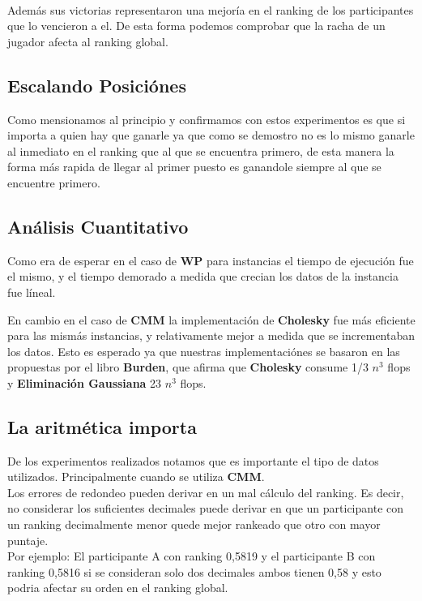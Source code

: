 \\
Además sus victorias representaron una mejoría en el ranking de los participantes que lo vencieron a el. De esta forma podemos comprobar que la racha de un jugador afecta al ranking global.\\


\subsection{Escalando Posici\'ones}
Como mensionamos al principio y confirmamos con estos experimentos es que si importa a quien hay que ganarle ya que como se demostro no es lo mismo ganarle al inmediato en el 
ranking que al que se encuentra primero,
de esta manera la forma m\'as rapida de llegar al primer puesto es ganandole siempre al que se encuentre primero.

\subsection{Análisis Cuantitativo}

Como era de esperar en el caso de \textbf{WP} para instancias el tiempo de ejecución fue el mismo, y el tiempo demorado a medida que crecian los datos de la instancia fue l\'ineal.

En cambio en el caso de \textbf{CMM} la implementación de \textbf{Cholesky} fue m\'as eficiente para las mism\'as instancias, y relativamente mejor a medida que se incrementaban los datos. 
Esto es esperado ya que nuestras implementaci\'ones se basaron en las propuestas por el libro \textbf{Burden}, que afirma que \textbf{Cholesky} consume 1/3 $n^3$ flops y 
\textbf{Eliminación Gaussiana} 2\/3 $n^3$ flops.


\subsection{La aritmética importa}

De los experimentos realizados notamos que es importante el tipo de datos utilizados. Principalmente cuando se utiliza \textbf{CMM}.
\\

Los errores de redondeo pueden derivar en un mal cálculo del ranking. Es decir, no considerar los suficientes decimales puede derivar en que un participante con un ranking
decimalmente menor quede mejor rankeado que otro con mayor puntaje.\\

Por ejemplo: El participante A con ranking 0,5819 y el participante B con ranking 0,5816 si se consideran solo dos decimales ambos tienen 0,58 y esto podria afectar su orden 
en el ranking global. \\

